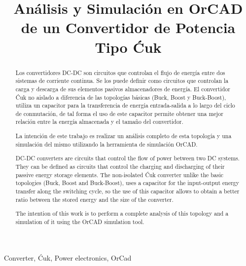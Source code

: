 \documentclass[conference]{IEEEtran}
\begin{document}
\fancyhf{} 
\rhead[]{\thepage}
\renewcommand{\footrulewidth}{0.5pt}

\title{Análisis y Simulación en OrCAD de un Convertidor de Potencia Tipo Ćuk}



\maketitle

\begin{abstract} %
Los convertidores DC-DC son circuitos que controlan el flujo de energía entre dos sistemas de corriente continua. Se los puede definir como circuitos que controlan la carga y descarga de sus elementos pasivos almacenadores de energía. El convertidor Ćuk no aislado a diferencia de las topologías básicas (Buck, Boost y Buck-Boost), utiliza un capacitor para la transferencia de energía entrada-salida a lo largo del ciclo de conmutación, de tal forma el uso de este capacitor permite obtener una mejor relación entre la energía almacenada y el tamaño del convertidor.

La intención de este trabajo es realizar un análisis completo de esta topología y una simulación del mismo utilizando la herramienta de simulación OrCAD.
\end{abstract}

\def\abstractname{Abstract}

\begin{abstract} %
DC-DC converters are circuits that control the flow of power between two DC systems. They can be defined as circuits that control the charging and discharging of their passive energy storage elements. The non-isolated Ćuk converter unlike the basic topologies (Buck, Boost and Buck-Boost), uses a capacitor for the input-output energy transfer along the switching cycle, so the use of this capacitor allows to obtain a better ratio between the stored energy and the size of the converter.

The intention of this work is to perform a complete analysis of this topology and a simulation of it using the OrCAD simulation tool.
\end{abstract}

\begin{IEEEkeywords} %
Converter, Ćuk, Power electronics, OrCad
\end{IEEEkeywords}
\end{document}
